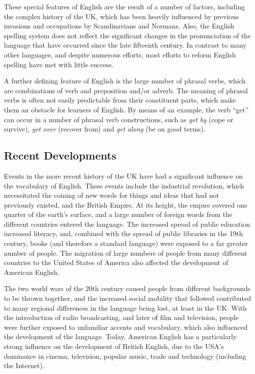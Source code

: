 \begin{multicols}{2}
   
These special features of English are the result of a number of factors, including the complex history of the UK, which has been heavily influenced by previous invasions and occupations by Scandinavians and Normans. Also, the English spelling system does not reflect the significant changes in the pronunciation of the language that have occurred since the late fifteenth century. In contrast to many other languages, and despite numerous efforts, most efforts to reform English spelling have met with little success.

A further defining feature of English is the large number of phrasal verbs, which are combinations of verb and preposition and/or adverb. The meaning of phrasal verbs is often not easily predictable from their constituent parts, which make them an obstacle for learners of English. By means of an example, the verb ``get'' can occur in a number of phrasal verb constructions, such as \textit{get by} (cope or survive), \textit{get over} (recover from) and \textit{get along} (be on good terms).
   

\subsection{Recent Developments}

Events in the more recent history of the UK have had a significant influence on the vocabulary of English. These events include the industrial revolution, which necessitated the coining of new words for things and ideas that had not previously existed, and the British Empire. At its height, the empire covered one quarter of the earth’s surface, and a large number of foreign words from the different countries entered the language. The increased spread of public education increased literacy, and, combined with the spread of public libraries in the 19th century, books (and therefore a standard language) were exposed to a far greater number of people. The migration of large numbers of people from many different countries to the United States of America also affected the development of American English.

The two world wars of the 20th century caused people from different backgrounds to be thrown together, and the increased social mobility that followed contributed to many regional differences in the language being lost, at least in the UK. With the introduction of radio broadcasting, and later of film and television, people were further exposed to unfamiliar accents and vocabulary, which also influenced the development of the language. Today, American English has a particularly strong influence on the development of British English, due to the USA’s dominance in cinema, television, popular music, trade and technology (including the Internet).
    

\end{multicols}
